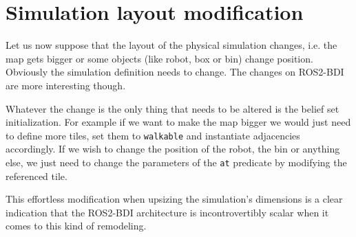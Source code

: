 \section{Simulation layout modification} 
Let us now suppose that the layout of the physical simulation changes, i.e. the map gets bigger or some objects (like robot, box or bin) change position. Obviously the simulation definition needs to change. The changes on ROS2-BDI are more interesting though.
\par
Whatever the change is the only thing that needs to be altered is the belief set initialization. For example if we want to make the map bigger we would just need to define more tiles, set them to \texttt{walkable} and instantiate adjacencies accordingly. If we wish to change the position of the robot, the bin or anything else, we just need to change the parameters of the \texttt{at} predicate by modifying the referenced tile.
\par
This effortless modification when upsizing the simulation's dimensions is a clear indication that the ROS2-BDI architecture is incontrovertibly scalar when it comes to this kind of remodeling.

